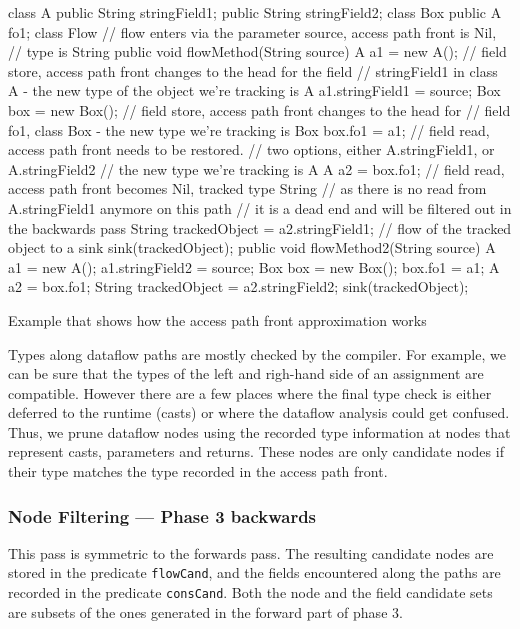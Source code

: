 \begin{listing}[H]
    \begin{javacode}
class A {
    public String stringField1;
    public String stringField2;
}
class Box {
    public A fo1;
}
class Flow {
    // flow enters via the parameter source, access path front is Nil,
    // type is String
    public void flowMethod(String source) {
        A a1 = new A();
        // field store, access path front changes to the head for the field 
        // stringField1 in class A - the new type of the object we're tracking is A
        a1.stringField1 = source;
        Box box = new Box();
        // field store, access path front changes to the head for
        // field fo1, class Box - the new type we're tracking is Box
        box.fo1 = a1;
        // field read, access path front needs to be restored.
        // two options, either A.stringField1, or A.stringField2
        // the new type we're tracking is A
        A a2 = box.fo1;
        // field read, access path front becomes Nil, tracked type String
        // as there is no read from A.stringField1 anymore on this path 
        // it is a dead end and will be filtered out in the backwards pass
        String trackedObject = a2.stringField1;
        // flow of the tracked object to a sink
        sink(trackedObject);
    }         
    public void flowMethod2(String source) {
        A a1 = new A();
        a1.stringField2 = source;
        Box box = new Box();
        box.fo1 = a1;
        A a2 = box.fo1;
        String trackedObject = a2.stringField2;
        sink(trackedObject);
    }
}
    \end{javacode}
    \caption{Example that shows how the access path front approximation works}
    \label{lst:accesspathfronts}
\end{listing}

Types along dataflow paths are mostly checked by the compiler.
For example, we can be sure that the types of the left and righ-hand side of an
assignment are compatible.
However there are a few places where the final type check is either deferred to 
the runtime (casts) or where the dataflow analysis could get confused.
Thus, we prune dataflow nodes using the recorded type information at nodes that represent 
casts, parameters and returns.
These nodes are only candidate nodes if their type 
matches the type recorded in the access path front.

\subsubsection*{Node Filtering --- Phase 3 backwards}
This pass is symmetric to the forwards pass.
The resulting candidate nodes are stored in the predicate \texttt{flowCand},
and the fields encountered along the paths are recorded in
the predicate \texttt{consCand}.
Both the node and the field candidate sets are subsets of the ones generated
in the forward part of phase 3.

